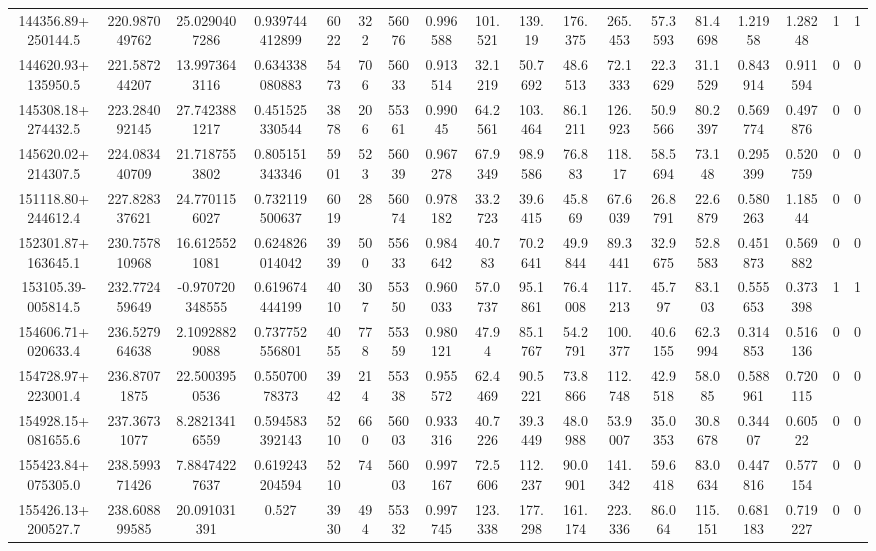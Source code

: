 \begin{table}
\begin{tabular}{cccccccccccccccccc}
144356.89+250144.5 & 220.987049762 & 25.0290407286 & 0.939744412899 & 6022 & 322 & 56076 & 0.996588 & 101.521 & 139.19 & 176.375 & 265.453 & 57.3593 & 81.4698 & 1.21958 & 1.28248 & 1 & 1 \\
144620.93+135950.5 & 221.587244207 & 13.9973643116 & 0.634338080883 & 5473 & 706 & 56033 & 0.913514 & 32.1219 & 50.7692 & 48.6513 & 72.1333 & 22.3629 & 31.1529 & 0.843914 & 0.911594 & 0 & 0 \\
145308.18+274432.5 & 223.284092145 & 27.7423881217 & 0.451525330544 & 3878 & 206 & 55361 & 0.99045 & 64.2561 & 103.464 & 86.1211 & 126.923 & 50.9566 & 80.2397 & 0.569774 & 0.497876 & 0 & 0 \\
145620.02+214307.5 & 224.083440709 & 21.7187553802 & 0.805151343346 & 5901 & 523 & 56039 & 0.967278 & 67.9349 & 98.9586 & 76.883 & 118.17 & 58.5694 & 73.148 & 0.295399 & 0.520759 & 0 & 0 \\
151118.80+244612.4 & 227.828337621 & 24.7701156027 & 0.732119500637 & 6019 & 28 & 56074 & 0.978182 & 33.2723 & 39.6415 & 45.869 & 67.6039 & 26.8791 & 22.6879 & 0.580263 & 1.18544 & 0 & 0 \\
152301.87+163645.1 & 230.757810968 & 16.6125521081 & 0.624826014042 & 3939 & 500 & 55633 & 0.984642 & 40.783 & 70.2641 & 49.9844 & 89.3441 & 32.9675 & 52.8583 & 0.451873 & 0.569882 & 0 & 0 \\
153105.39-005814.5 & 232.772459649 & -0.970720348555 & 0.619674444199 & 4010 & 307 & 55350 & 0.960033 & 57.0737 & 95.1861 & 76.4008 & 117.213 & 45.797 & 83.103 & 0.555653 & 0.373398 & 1 & 1 \\
154606.71+020633.4 & 236.527964638 & 2.10928829088 & 0.737752556801 & 4055 & 778 & 55359 & 0.980121 & 47.94 & 85.1767 & 54.2791 & 100.377 & 40.6155 & 62.3994 & 0.314853 & 0.516136 & 0 & 0 \\
154728.97+223001.4 & 236.87071875 & 22.5003950536 & 0.55070078373 & 3942 & 214 & 55338 & 0.955572 & 62.4469 & 90.5221 & 73.8866 & 112.748 & 42.9518 & 58.085 & 0.588961 & 0.720115 & 0 & 0 \\
154928.15+081655.6 & 237.36731077 & 8.28213416559 & 0.594583392143 & 5210 & 660 & 56003 & 0.933316 & 40.7226 & 39.3449 & 48.0988 & 53.9007 & 35.0353 & 30.8678 & 0.34407 & 0.60522 & 0 & 0 \\
155423.84+075305.0 & 238.599371426 & 7.88474227637 & 0.619243204594 & 5210 & 74 & 56003 & 0.997167 & 72.5606 & 112.237 & 90.0901 & 141.342 & 59.6418 & 83.0634 & 0.447816 & 0.577154 & 0 & 0 \\
155426.13+200527.7 & 238.608899585 & 20.091031391 & 0.527 & 3930 & 494 & 55332 & 0.997745 & 123.338 & 177.298 & 161.174 & 223.336 & 86.064 & 115.151 & 0.681183 & 0.719227 & 0 & 0 \\

\end{tabular}
\end{table}
